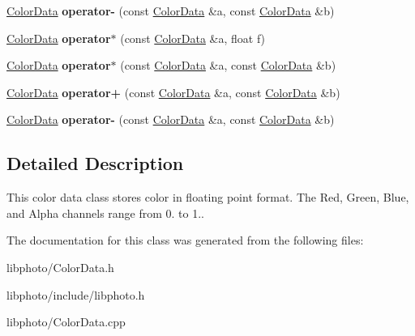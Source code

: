 \begin{DoxyCompactItemize}
\item 
\hypertarget{classColorData_a799bd54f65a61569b5b968062ac0d37e}{\hyperlink{classColorData}{Color\-Data} {\bfseries operator-\/} (const \hyperlink{classColorData}{Color\-Data} \&a, const \hyperlink{classColorData}{Color\-Data} \&b)}\label{classColorData_a799bd54f65a61569b5b968062ac0d37e}

\item 
\hypertarget{classColorData_adf9a770243996e50282d248a4327f351}{\hyperlink{classColorData}{Color\-Data} {\bfseries operator$\ast$} (const \hyperlink{classColorData}{Color\-Data} \&a, float f)}\label{classColorData_adf9a770243996e50282d248a4327f351}

\item 
\hypertarget{classColorData_afdc3e8e6338798779739352e6bdfa42b}{\hyperlink{classColorData}{Color\-Data} {\bfseries operator$\ast$} (const \hyperlink{classColorData}{Color\-Data} \&a, const \hyperlink{classColorData}{Color\-Data} \&b)}\label{classColorData_afdc3e8e6338798779739352e6bdfa42b}

\item 
\hypertarget{classColorData_afee00faf26189979b72f3854a17200ae}{\hyperlink{classColorData}{Color\-Data} {\bfseries operator+} (const \hyperlink{classColorData}{Color\-Data} \&a, const \hyperlink{classColorData}{Color\-Data} \&b)}\label{classColorData_afee00faf26189979b72f3854a17200ae}

\item 
\hypertarget{classColorData_a799bd54f65a61569b5b968062ac0d37e}{\hyperlink{classColorData}{Color\-Data} {\bfseries operator-\/} (const \hyperlink{classColorData}{Color\-Data} \&a, const \hyperlink{classColorData}{Color\-Data} \&b)}\label{classColorData_a799bd54f65a61569b5b968062ac0d37e}

\end{DoxyCompactItemize}


\subsection{Detailed Description}
This color data class stores color in floating point format. The Red, Green, Blue, and Alpha channels range from 0. to 1.. 

The documentation for this class was generated from the following files\-:\begin{DoxyCompactItemize}
\item 
libphoto/Color\-Data.\-h\item 
libphoto/include/libphoto.\-h\item 
libphoto/Color\-Data.\-cpp\end{DoxyCompactItemize}
